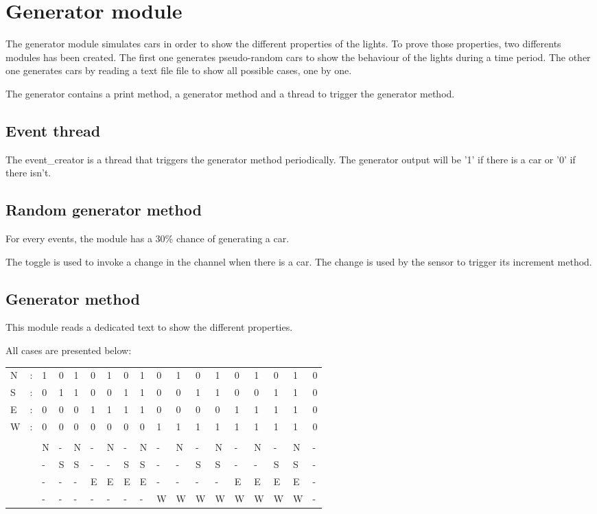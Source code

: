 \section{Generator module}

The generator module simulates cars in order to show the different properties of the lights. 
To prove those properties, two differents modules has been created.
The first one generates pseudo-random cars to show the behaviour of the lights during a time period.
The other one generates cars by reading a text file file to show all possible cases, one by one. 

The generator contains a print method, a generator method and a thread to trigger the generator method.

\subsection{Event thread}

The event{\_}creator is a thread that triggers the generator method periodically. The generator output will be '1' if there is a car or  '0' if there isn't.

\subsection{Random generator method}

For every events, the module has a 30{\%} chance of generating a car.

The toggle is used to invoke a change in the channel when there is a car. The change is used by the sensor to trigger its increment method.

\subsection{Generator method}

This module reads a dedicated text to show the different properties. 

All cases are presented below: 

\begin{table}[]
\begin{tabular}{llllllllllllllllll}
N & : & 1 & 0 & 1 & 0 & 1 & 0 & 1 & 0 & 1 & 0 & 1 & 0 & 1 & 0 & 1 & 0 \\
S & : & 0 & 1 & 1 & 0 & 0 & 1 & 1 & 0 & 0 & 1 & 1 & 0 & 0 & 1 & 1 & 0 \\
E & : & 0 & 0 & 0 & 1 & 1 & 1 & 1 & 0 & 0 & 0 & 0 & 1 & 1 & 1 & 1 & 0 \\
W & : & 0 & 0 & 0 & 0 & 0 & 0 & 0 & 1 & 1 & 1 & 1 & 1 & 1 & 1 & 1 & 0 \\
  &   &   &   &   &   &   &   &   &   &   &   &   &   &   &   &   &   \\
  &   & N & - & N & - & N & - & N & - & N & - & N & - & N & - & N & - \\
  &   & - & S & S & - & - & S & S & - & - & S & S & - & - & S & S & - \\
  &   & - & - & - & E & E & E & E & - & - & - & - & E & E & E & E & - \\
  &   & - & - & - & - & - & - & - & W & W & W & W & W & W & W & W & -
\end{tabular}
\end{table}
